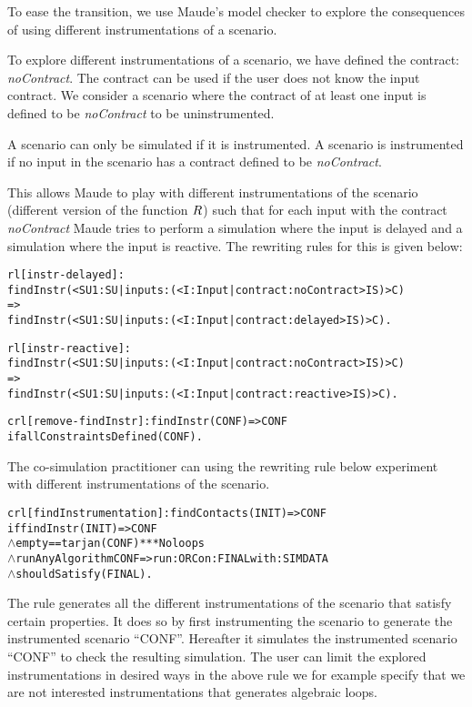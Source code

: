 To ease the transition, we use Maude's model checker to explore the consequences of using different instrumentations of a scenario.

To explore different instrumentations of a scenario, we have defined the contract: \textit{noContract}.
The contract can be used if the user does not know the input contract.
We consider a scenario where the contract of at least one input is defined to be \textit{noContract} to be uninstrumented.

A scenario can only be simulated if it is instrumented.
A scenario is instrumented if no input in the scenario has a contract defined to be \textit{noContract}.


This allows Maude to play with different instrumentations of the scenario (different version of the function $R$) such that for each input with the contract \textit{noContract} Maude tries to perform a simulation where the input is delayed and a simulation where the input is reactive.
The rewriting rules for this is given below:
\begin{alltt}
  \small
rl [instr-delayed]: 
findInstr(< SU1 : SU | inputs : (< I : Input | contract : noContract > IS) > C)
=>
findInstr(< SU1 : SU | inputs : (< I : Input | contract : delayed > IS) > C) .

rl [instr-reactive]: 
findInstr(< SU1 : SU | inputs : (< I : Input | contract : noContract > IS) > C)
=>
findInstr(< SU1 : SU | inputs : (< I : Input | contract : reactive > IS) > C) .

crl [remove-findInstr]: findInstr(CONF) => CONF 
  if allConstraintsDefined(CONF) .
\end{alltt}

The co-simulation practitioner can using the rewriting rule below experiment with different instrumentations of the scenario.

\begin{alltt}
  \small
  crl [findInstrumentation]: findContacts(INIT) => CONF
      if findInstr(INIT) => CONF
      \(\land\) empty == tarjan(CONF) *** No loops
      \(\land\) runAnyAlgorithm CONF => run: ORC on: FINAL with: SIMDATA
      \(\land\) shouldSatisfy(FINAL) .
  \end{alltt}

The rule generates all the different instrumentations of the scenario that satisfy certain properties.
It does so by first instrumenting the scenario to generate the instrumented scenario ``CONF''.
Hereafter it simulates the instrumented scenario ``CONF'' to check the resulting simulation.
The user can limit the explored instrumentations in desired ways in the above rule we for example specify that we are not interested instrumentations that generates algebraic loops.

